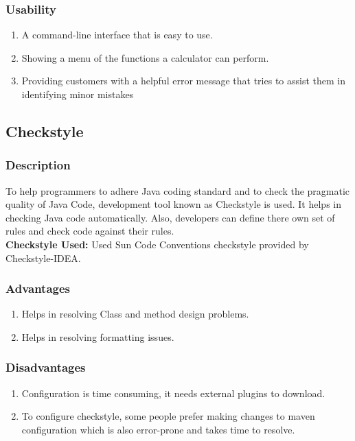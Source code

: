 \documentclass[a4paper,12pt]{report}
\begin{document}
\subsubsection{Usability}
\begin{enumerate}
   \item A command-line interface that is easy to use.
    \item Showing a menu of the functions a calculator can perform.
    \item Providing customers with a helpful error message that tries to assist them in identifying minor mistakes

\end{enumerate}


\pagebreak
\subsection{Checkstyle}
\subsubsection{Description} To help programmers to adhere Java coding standard and to check the pragmatic quality of Java Code, development tool known as Checkstyle is used. It helps in checking Java code automatically. Also, developers can define there own set of rules and check code against their rules.\cite{b11}
\\\textbf{Checkstyle Used:} Used Sun Code Conventions checkstyle provided by Checkstyle-IDEA.


\subsubsection{Advantages}
\begin{enumerate}
    \item Helps in resolving Class and method design problems.\cite{b11}
    \item Helps in resolving formatting issues.\cite{b11}
\end{enumerate}
\subsubsection{Disadvantages}
\begin{enumerate}
    \item Configuration is time consuming, it needs external plugins to download.
    \item To configure checkstyle, some people prefer making changes to maven configuration which is also error-prone and takes time to resolve.
\end{enumerate}
\end{document}
